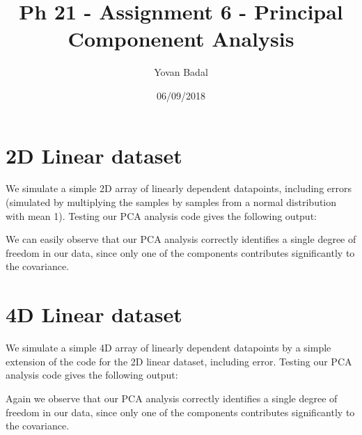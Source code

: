 \documentclass[11pt]{article}
\begin{document}
	\title{Ph 21 - Assignment 6 - Principal Componenent Analysis}
	\author{Yovan Badal}
	\date{06/09/2018}
	\maketitle
	
\section{2D Linear dataset}
We simulate a simple 2D array of linearly dependent datapoints, including errors (simulated by multiplying the samples by samples from a normal distribution with mean 1). Testing our PCA analysis code gives the following output:


We can easily observe that our PCA analysis correctly identifies a single degree of freedom in our data, since only one of the components contributes significantly to the covariance.

\section{4D Linear dataset}
We simulate a simple 4D array of linearly dependent datapoints by a simple extension of the code for the 2D linear dataset, including error. Testing our PCA analysis code gives the following output:


Again we observe that our PCA analysis correctly identifies a single degree of freedom in our data, since only one of the components contributes significantly to the covariance.
\end{document}
